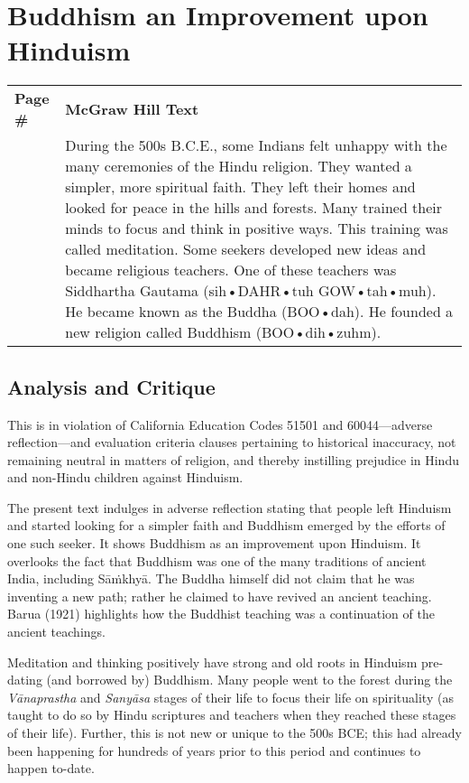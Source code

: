 \chapter{Buddhism an Improvement upon Hinduism}

\begin{longtable}{|>{\raggedleft}p{1.5cm}|p{8.5cm}|}
\multicolumn{2}{c}{\textbf{Table: 1}}\\ 
\hline
\textbf{Page \#} & \textbf{McGraw Hill Text} \tabularnewline
\hline 
264 & During the 500s B.C.E., some Indians felt unhappy with the many ceremonies of the Hindu religion. They wanted a simpler, more spiritual faith. They left their homes and looked for peace in the hills and forests. Many trained their minds to focus and think in positive ways. This training was called meditation. Some seekers developed new ideas and became religious teachers. One of these teachers was Siddhartha Gautama (sih•DAHR•tuh GOW•tah•muh). He became known as the Buddha (BOO•dah). He founded a new religion called Buddhism (BOO•dih•zuhm).\tabularnewline
\hline
\end{longtable}

\section*{Analysis and Critique} 

This is in violation of California Education Codes 51501 and 60044—adverse reflection—and evaluation criteria clauses pertaining to historical inaccuracy, not remaining neutral in matters of religion, and thereby instilling prejudice in Hindu and non-Hindu children against Hinduism.

The present text indulges in adverse reflection stating that people left Hinduism and started looking for a simpler faith and Buddhism emerged by the efforts of one such seeker. It shows Buddhism as an improvement upon Hinduism. It overlooks the fact that Buddhism was one of the many traditions of ancient India, including Sāṁkhyā. The Buddha himself did not claim that he was inventing a new path; rather he claimed to have revived an ancient teaching. Barua (1921) highlights how the Buddhist teaching was a continuation of the ancient teachings. 

Meditation and thinking positively have strong and old roots in Hinduism pre-dating (and borrowed by) Buddhism. Many people went to the forest during the \textit{Vānaprastha} and \textit{Sanyāsa} stages of their life to focus their life on spirituality (as taught to do so by Hindu scriptures and teachers when they reached these stages of their life). Further, this is not new or unique to the 500s BCE; this had already been happening for hundreds of years prior to this period and continues to happen to-date.

